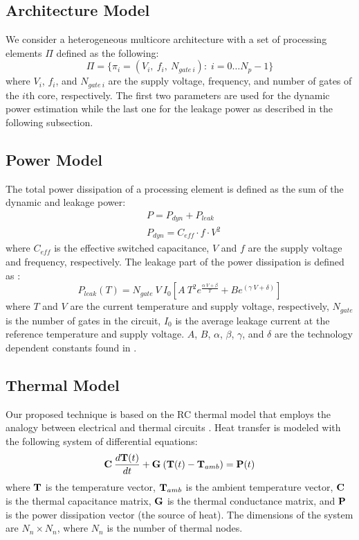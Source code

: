 \subsection{Architecture Model} \label{sec:architecture-model}
We consider a heterogeneous multicore architecture with a set of processing elements $\Pi$ defined as the following:
\[
  \Pi = \{ \pi_i = (V_i, \: f_i, \: N_{gate \: i}): \; i = 0 \dots N_p - 1 \}
\]
where $V_i$, $f_i$, and $N_{gate \: i}$ are the supply voltage, frequency, and number of gates \cite{liao2005} of the $i$th core, respectively. The first two parameters are used for the dynamic power estimation while the last one for the leakage power as described in the following subsection.

\subsection{Power Model} \label{sec:power-model}
The total power dissipation of a processing element is defined as the sum of the dynamic and leakage power:
\begin{align*}
  & P = P_{dyn} + P_{leak} \\
  & P_{dyn} = C_{eff} \cdot f \cdot V^2
\end{align*}
where $C_{eff}$ is the effective switched capacitance, $V$ and $f$ are the supply voltage and frequency, respectively. The leakage part of the power dissipation is defined as \cite{liao2005}:
\begin{equation} \label{eq:total-power}
  P_{leak}(T) = N_{gate} \: V \: I_0 \left[ A \: T^2 e^{\frac{\alpha \: V + \beta}{T}} + B e^{(\gamma \: V + \delta)} \right]
\end{equation}
where $T$ and $V$ are the current temperature and supply voltage, respectively, $N_{gate}$ is the number of gates in the circuit, $I_0$ is the average leakage current at the reference temperature and supply voltage. $A$, $B$, $\alpha$, $\beta$, $\gamma$, and $\delta$ are the technology dependent constants found in \cite{liao2005}.

\subsection{Thermal Model} \label{sec:thermal-model}
Our proposed technique is based on the RC thermal model that employs the analogy between electrical and thermal circuits \cite{kreith2000}. Heat transfer is modeled with the following system of differential equations:
\begin{equation} \label{eq:fourier-model}
  \mathbf{C} \: \frac{d\mathbf{T}(t)}{dt} + \mathbf{G} \: (\mathbf{T}(t) - \mathbf{T}_{amb})= \mathbf{P}(t)
\end{equation}
where $\mathbf{T}$ is the temperature vector, $\mathbf{T}_{amb}$ is the ambient temperature vector, $\mathbf{C}$ is the thermal capacitance matrix, $\mathbf{G}$ is the thermal conductance matrix, and $\mathbf{P}$ is the power dissipation vector (the source of heat). The dimensions of the system are $N_n \times N_n$, where $N_n$ is the number of thermal nodes.

